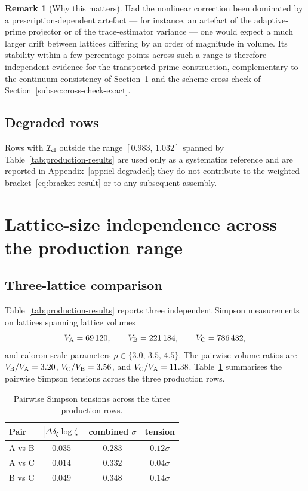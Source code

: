 \documentclass[a4paper,11pt]{article}
\theoremstyle{definition}
\newtheorem{remark}[theorem]{Remark}
\newcommand{\Icl}{\mathcal{I}_{\rm cl}}
\begin{document}
\begin{remark}[Why this matters]
\label{rem:universality-significance}
Had the nonlinear correction been dominated by a
prescription-dependent artefact --- for instance, an artefact of
the adaptive-prime projector or of the trace-estimator variance ---
one would expect a much larger drift between lattices differing by
an order of magnitude in volume. Its stability within a few
percentage points across such a range is therefore independent
evidence for the transported-prime construction, complementary to
the continuum consistency of Section~\ref{sec:continuum} and the
scheme cross-check of Section~\ref{subsec:cross-check-exact}.
\end{remark}

\subsection{Degraded rows}
\label{subsec:degraded-deferred}

Rows with $\Icl$ outside the range $[0.983,\,1.032]$ spanned by
Table~\ref{tab:production-results} are used only as a systematics
reference and are reported in Appendix~\ref{app:icl-degraded}; they
do not contribute to the weighted
bracket~\eqref{eq:bracket-result} or to any subsequent assembly.


\section{Lattice-size independence across the production range}
\label{sec:continuum}

\subsection{Three-lattice comparison}
\label{subsec:three-lattice}

Table~\ref{tab:production-results} reports three independent
Simpson measurements on lattices spanning lattice volumes
\begin{equation}
V_{\rm A} = 69\,120,
\qquad
V_{\rm B} = 221\,184,
\qquad
V_{\rm C} = 786\,432,
\label{eq:three-volumes}
\end{equation}
and caloron scale parameters $\rho \in \{3.0,\,3.5,\,4.5\}$. The
pairwise volume ratios are $V_{\rm B}/V_{\rm A} = 3.20$,
$V_{\rm C}/V_{\rm B} = 3.56$, and $V_{\rm C}/V_{\rm A} = 11.38$.
Table~\ref{tab:pairwise} summarises the pairwise Simpson tensions
across the three production rows.

\begin{table}[h]
\centering
\begin{tabular}{lccc}
\toprule
Pair & $|\Delta \delta_\xi \log\zeta|$ & combined $\sigma$ & tension \\
\midrule
A vs B & $0.035$ & $0.283$ & $0.12\sigma$ \\
A vs C & $0.014$ & $0.332$ & $0.04\sigma$ \\
B vs C & $0.049$ & $0.348$ & $0.14\sigma$ \\
\bottomrule
\end{tabular}
\caption{Pairwise Simpson tensions across the three production
rows.}
\label{tab:pairwise}
\end{table}
\end{document}
